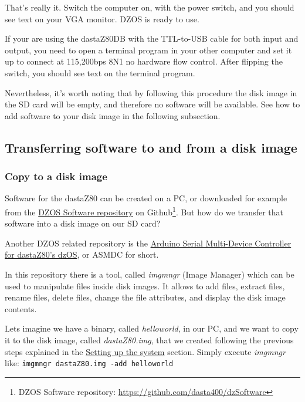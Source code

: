 That’s really it. Switch the computer on, with the power switch, and you
should see text on your VGA monitor. DZOS is ready to use.

If your are using the dastaZ80DB with the TTL-to-USB cable for both input and
output, you need to open a terminal program in your other computer and set it up
to connect at 115,200bps 8N1 no hardware flow control. After flipping the
switch, you should see text on the terminal program.

Nevertheless, it's worth noting that by following this procedure the disk
image in the SD card will be empty, and therefore no software will be
available. See how to add software to your disk image in the following
subsection.

    \subsection{Transferring software to and from a disk image}

        \subsubsection{Copy to a disk image}

        Software for the dastaZ80 can be created on a PC, or downloaded for example
        from the \href{https://github.com/dasta400/dzSoftware}{DZOS Software repository}
        on Github\footnote{DZOS Software repository: 
        \url{https://github.com/dasta400/dzSoftware}}. But how do we transfer that
        software into a disk image on our SD card?

        Another DZOS related repository is the \href{https://github.com/dasta400/asmdc}
        {Arduino Serial Multi-Device Controller for dastaZ80's dzOS}, or ASMDC for
        short.

        In this repository there is a tool, called \textit{imgmngr} (Image Manager)
        which can be used to manipulate files inside disk images. It allows to add
        files, extract files, rename files, delete files, change the file attributes,
        and display the disk image contents.

        Lets imagine we have a binary, called \textit{helloworld}, in our PC, and we
        want to copy it to the disk image, called \textit{dastaZ80.img}, that we
        created following the previous steps explained in the
        \hyperref[sec:setting_system]{Setting up the system} section. Simply execute
        \textit{imgmngr} like: \texttt{imgmngr dastaZ80.img -add helloworld}

